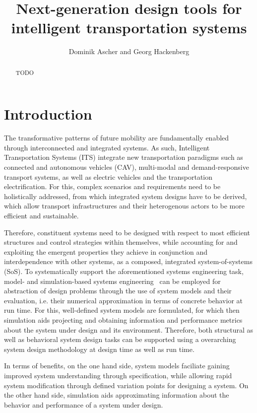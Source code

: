 \documentclass[10pt,twocolumn]{article}
\begin{document}
\title{Next-generation design tools for intelligent transportation systems}
\author{Dominik Ascher and Georg Hackenberg}
\maketitle

\begin{abstract}
    TODO
\end{abstract}

\section{Introduction}
\label{sec:introduction}

The transformative patterns of future mobility are fundamentally enabled through interconnected and integrated systems.
As such, Intelligent Transportation Systems (ITS) integrate new transportation paradigms such as connected and autonomous vehicles (CAV), multi-modal and demand-responsive transport systems, as well as electric vehicles and the transportation electrification. For this, complex scenarios and requirements need to be holistically addressed, from which integrated system designs have to be derived, which allow transport infrastructures and their heterogenous actors to be more efficient and sustainable.

Therefore, constituent systems need to be designed with respect to most efficient structures and control strategies within themselves, while accounting for and exploiting the emergent properties they achieve in conjunction and interdependence with other systems, as a composed, integrated system-of-systems (SoS). To systematically support the aforementioned systems engineering task, model- and simulation-based systems engineering~\cite{gianni2014modeling} can be employed for abstraction of design problems through the use of system models and their evaluation, i.e. their numerical approximation in terms of concrete behavior at run time. For this, well-defined system models are formulated, for which then simulation aids projecting and obtaining information and performance metrics about the system under design and its environment. Therefore, both structural as well as behavioral system design tasks can be supported using a overarching system design methodology at design time as well as run time.

In terms of benefits, on the one hand side, system models faciliate gaining improved system understanding through specification, while allowing rapid system modification through defined variation points for designing a system. On the other hand side, simulation aids approximating information about the behavior and performance of a system under design.
\end{document}
